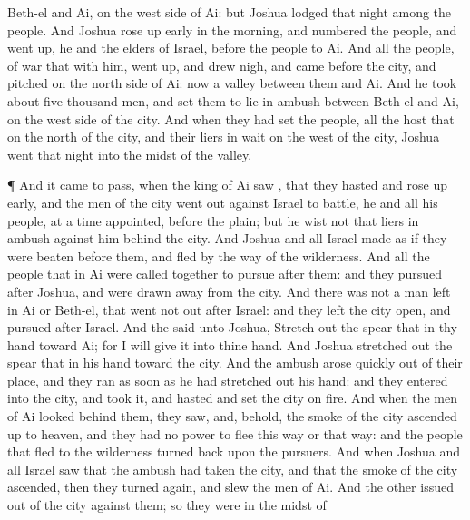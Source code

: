 {Beth-el and
Ai, on the west
side of
Ai: but
Joshua
lodged that
night
among the
people.
And
Joshua rose up
early in the
morning, and
numbered the
people, and went
up, he and the
elders of
Israel,
before the
people to
Ai.
And all the
people,
{} of
war that
{} with him, went
up, and drew
nigh, and
came before the
city, and
pitched on the north
side of
Ai: now
{} a
valley between them and
Ai.
And he
took about
five
thousand
men, and
set them to lie in
ambush between
Beth-el and
Ai, on the west
side of the
city.
And when they had
set the
people,
{} all the
host that
{} on the
north of the
city, and their liers in
wait on the
west of the
city,
Joshua
went that
night into the
midst of the
valley.
\par }{\PP {}¶ And it came to pass, when the
king of
Ai
saw
{}, that they
hasted and rose up
early, and the
men of the
city went
out
against
Israel to
battle, he and all his
people, at a time
appointed,
before the
plain; but he
wist not that
{} liers in
ambush against him
behind the
city.
And
Joshua and all
Israel made as if they were
beaten
before them, and
fled by the
way of the
wilderness.
And all the
people that
{} in
Ai were
called together to
pursue
after them: and they
pursued
after
Joshua, and were drawn
away from the
city.
And there was not a
man
left in
Ai or
Beth-el, that went not
out
after
Israel: and they
left the
city
open, and
pursued after
Israel.
And the
{}
said unto
Joshua, Stretch
out the
spear that
{} in thy
hand toward
Ai; for I will
give it into thine
hand. And
Joshua stretched
out the
spear that
{} in his
hand toward the
city.
And the
ambush
arose
quickly out of their
place, and they
ran as soon as he had stretched
out his
hand: and they
entered into the
city, and
took it, and
hasted and
set the
city on
fire.
And when the
men of
Ai
looked
behind them, they
saw, and, behold, the
smoke of the
city ascended
up to
heaven, and they had no
power to
flee this way or that
way: and the
people that
fled to the
wilderness turned
back upon the
pursuers.
And when
Joshua and all
Israel
saw that the
ambush had
taken the
city, and that the
smoke of the
city
ascended, then they turned
again, and
slew the
men of
Ai.
And the
other issued
out of the
city
against them; so they were in the
midst of
}
